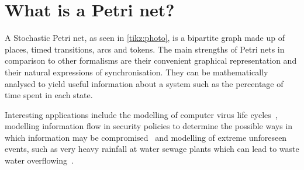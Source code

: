 \section{What is a Petri net?}
A Stochastic Petri net,  as seen in \cref{tikz:photo}, is a bipartite graph made up of places, timed transitions, arcs and tokens. The main strengths of Petri nets in comparison to other formalisms are their convenient graphical representation and their natural expressions of synchronisation. They can be mathematically analysed to yield useful information about a system such as the percentage of time spent in each state.

 Interesting applications include the modelling of computer virus life cycles~\cite{kotenko2005analyzing}, modelling information flow in security policies to determine the possible ways in which information may be compromised~\cite{varadharajan1990petri} and modelling of extreme unforeseen events, such as very heavy rainfall at water sewage plants which can lead to waste water overflowing~\cite{ghasemieh2013analysis}.